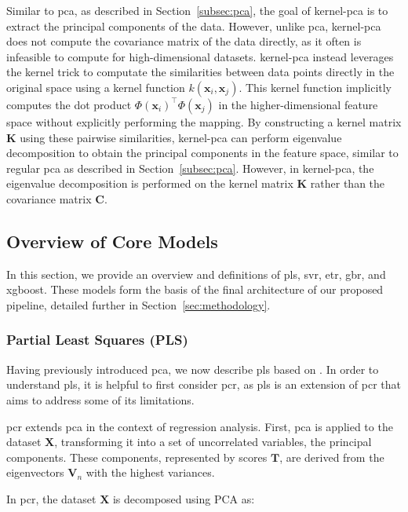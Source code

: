 Similar to \gls{pca}, as described in Section~\ref{subsec:pca}, the goal of \gls{kernel-pca} is to extract the principal components of the data.
However, unlike \gls{pca}, \gls{kernel-pca} does not compute the covariance matrix of the data directly, as it often is infeasible to compute for high-dimensional datasets.
\gls{kernel-pca} instead leverages the kernel trick to computate the similarities between data points directly in the original space using a kernel function $k(\mathbf{x}_i, \mathbf{x}_j)$. 
This kernel function implicitly computes the dot product $\Phi(\mathbf{x}_i)^\top \Phi(\mathbf{x}_j)$ in the higher-dimensional feature space without explicitly performing the mapping. 
By constructing a kernel matrix $\mathbf{K}$ using these pairwise similarities, \gls{kernel-pca} can perform eigenvalue decomposition to obtain the principal components in the feature space, similar to regular \gls{pca} as described in Section~\ref{subsec:pca}.
However, in \gls{kernel-pca}, the eigenvalue decomposition is performed on the kernel matrix $\mathbf{K}$ rather than the covariance matrix $\mathbf{C}$.

\subsection{Overview of Core Models}
In this section, we provide an overview and definitions of \gls{pls}, \gls{svr}, \gls{etr}, \gls{gbr}, and \gls{xgboost}.
These models form the basis of the final architecture of our proposed pipeline, detailed further in Section~\ref{sec:methodology}.

\subsubsection{Partial Least Squares (PLS)}
Having previously introduced \gls{pca}, we now describe \gls{pls} based on \citet{James2023AnIS}.
In order to understand \gls{pls}, it is helpful to first consider \gls{pcr}, as \gls{pls} is an extension of \gls{pcr} that aims to address some of its limitations.

\gls{pcr} extends \gls{pca} in the context of regression analysis.
First, \gls{pca} is applied to the dataset $\mathbf{X}$, transforming it into a set of uncorrelated variables, the principal components.
These components, represented by scores $\mathbf{T}$, are derived from the eigenvectors $\mathbf{V}_n$ with the highest variances.

In \gls{pcr}, the dataset $\mathbf{X}$ is decomposed using PCA as:

